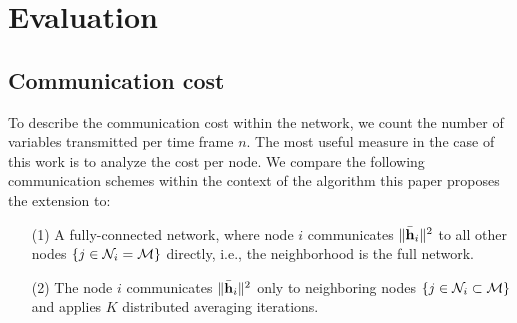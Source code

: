 \documentclass{article}
\begin{document}


\section{Evaluation}
\label{sec:simulations}
\subsection[]{Communication cost}
\label{sec:transcost}
To describe the communication cost within the network, we count the number of variables transmitted per time frame \(n\).
The most useful measure in the case of this work is to analyze the cost per node.
We compare the following communication schemes within the context of the algorithm \cite{blochbergerDBSI} this paper proposes the extension to:
\begin{itemize}
    \itemsep-0.2em
    \item[(1)] A fully-connected network, where node \(i\) communicates \(\|\bar{\bm{\mathrm{h}}}_i\|^2\) to all other nodes \(\{j \in \mathcal{N}_i = \mathcal{M}\}\) directly, i.e., the neighborhood is the full network.
    \item[(2)] The node \(i\) communicates \(\|\bar{\bm{\mathrm{h}}}_i\|^2\) only to neighboring nodes \(\{j \in \mathcal{N}_i \subset \mathcal{M}\}\) and applies \(K\) distributed averaging iterations.
\end{itemize}
\end{document}
